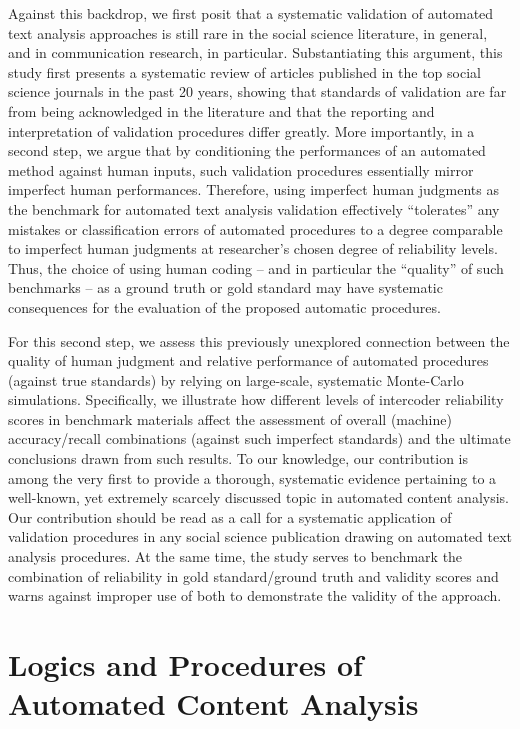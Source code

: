 \documentclass[man, 12pt, a4paper, nolmodern, noextraspace]{apa6}
\begin{document}
    Against this backdrop, we first posit that a systematic validation of automated text analysis approaches is still rare in the social science literature, in general, and in communication research, in particular. Substantiating this argument, this study first presents a systematic review of articles published in the top social science journals in the past 20 years, showing that standards of validation are far from being acknowledged in the literature and that the reporting and interpretation of validation procedures differ greatly. More importantly, in a second step, we argue that by conditioning the performances of an automated method against human inputs, such validation procedures essentially mirror imperfect human performances. Therefore, using imperfect human judgments as the benchmark for automated text analysis validation effectively \enquote{tolerates} any mistakes or classification errors of automated procedures to a degree comparable to imperfect human judgments at researcher’s chosen degree of reliability levels. Thus, the choice of using human coding – and in particular the \enquote{quality} of such benchmarks – as a ground truth or gold standard may have systematic consequences for the evaluation of the proposed automatic procedures. 

    For this second step, we assess this previously unexplored connection between the quality of human judgment and relative performance of automated procedures (against true standards) by relying on large-scale, systematic Monte-Carlo simulations. Specifically, we illustrate how different levels of intercoder reliability scores in benchmark materials affect the assessment of overall (machine) accuracy/recall combinations (against such imperfect standards) and the ultimate conclusions drawn from such results. To our knowledge, our contribution is among the very first to provide a thorough, systematic evidence pertaining to a well-known, yet extremely scarcely discussed topic in automated content analysis. Our contribution should be read as a call for a systematic application of validation procedures in any social science publication drawing on automated text analysis procedures. At the same time, the study serves to benchmark the combination of reliability in gold standard/ground truth and validity scores and warns against improper use of both to demonstrate the validity of the approach. 
    
\section{Logics and Procedures of Automated Content Analysis}
\end{document}
